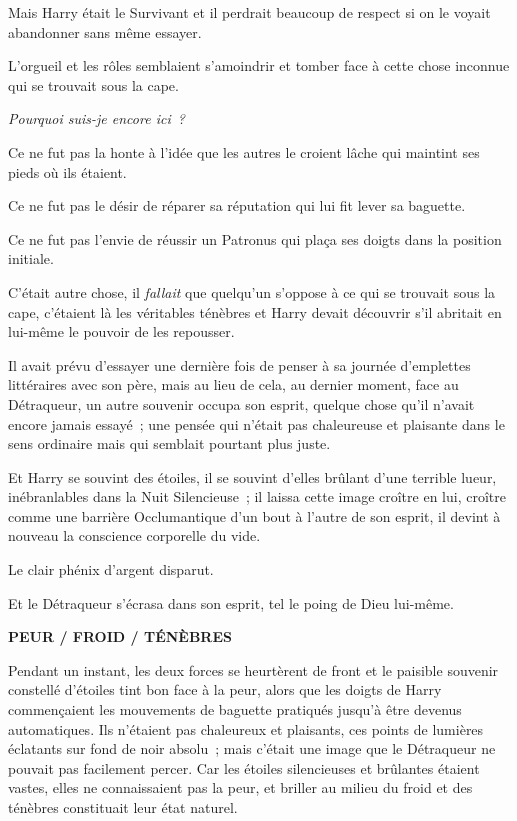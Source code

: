 Mais Harry était le Survivant et il perdrait beaucoup de respect si on le voyait abandonner sans même essayer.

L'orgueil et les rôles semblaient s'amoindrir et tomber face à cette chose inconnue qui se trouvait sous la cape.

\emph{Pourquoi suis-je encore ici~?}

Ce ne fut pas la honte à l'idée que les autres le croient lâche qui maintint ses pieds où ils étaient.

Ce ne fut pas le désir de réparer sa réputation qui lui fit lever sa baguette.

Ce ne fut pas l'envie de réussir un Patronus qui plaça ses doigts dans la position initiale.

C'était autre chose, il \emph{fallait} que quelqu'un s'oppose à ce qui se trouvait sous la cape, c'étaient là les véritables ténèbres et Harry devait découvrir s'il abritait en lui-même le pouvoir de les repousser.

Il avait prévu d'essayer une dernière fois de penser à sa journée d'emplettes littéraires avec son père, mais au lieu de cela, au dernier moment, face au Détraqueur, un autre souvenir occupa son esprit, quelque chose qu'il n'avait encore jamais essayé~; une pensée qui n'était pas chaleureuse et plaisante dans le sens ordinaire mais qui semblait pourtant plus juste.

Et Harry se souvint des étoiles, il se souvint d'elles brûlant d'une terrible lueur, inébranlables dans la Nuit Silencieuse~; il laissa cette image croître en lui, croître comme une barrière Occlumantique d'un bout à l'autre de son esprit, il devint à nouveau la conscience corporelle du vide.

Le clair phénix d'argent disparut.

Et le Détraqueur s'écrasa dans son esprit, tel le poing de Dieu lui-même.

\textbf{PEUR / FROID / TÉNÈBRES}

Pendant un instant, les deux forces se heurtèrent de front et le paisible souvenir constellé d'étoiles tint bon face à la peur, alors que les doigts de Harry commençaient les mouvements de baguette pratiqués jusqu'à être devenus automatiques. Ils n'étaient pas chaleureux et plaisants, ces points de lumières éclatants sur fond de noir absolu~; mais c'était une image que le Détraqueur ne pouvait pas facilement percer. Car les étoiles silencieuses et brûlantes étaient vastes, elles ne connaissaient pas la peur, et briller au milieu du froid et des ténèbres constituait leur état naturel.

